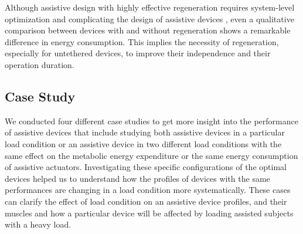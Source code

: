 \documentclass[10pt,letterpaper]{article}
\begin{document}
Although assistive design with highly effective regeneration requires system-level optimization and complicating the design of assistive devices \cite{140}, even a qualitative comparison between devices with and without regeneration shows a remarkable difference in energy consumption. This implies the necessity of regeneration, especially for untethered devices, to improve their independence and their operation duration.\\
\subsection*{Case Study}
We conducted four different case studies to get more insight into the performance of assistive devices that include studying both assistive devices in a particular load condition or an assistive device in two different load conditions with the same effect on the metabolic energy expenditure or the same energy consumption of assistive actuators. Investigating these specific configurations of the optimal devices helped us to understand how the profiles of devices with the same performances are changing in a load condition more systematically. These cases can clarify the effect of load condition on an assistive device profiles, and their muscles and how a particular device will be affected by loading assisted subjects with a heavy load.
\end{document}
